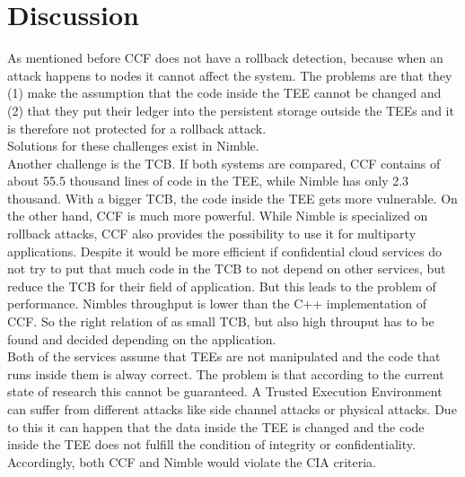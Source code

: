 \section{Discussion}
\label{challenges:ccf}
As mentioned before CCF does not have a rollback detection, because when an attack happens to nodes it cannot affect the system. The problems are that they (1) make the assumption that the code inside the TEE cannot be changed and (2) that they put their ledger into the persistent storage outside the TEEs and  it is therefore not protected for a rollback attack.\\
Solutions for these challenges exist in Nimble.\\
Another challenge is the TCB. If both systems are compared, CCF contains of about 55.5 thousand lines of code in the TEE, while Nimble has only 2.3 thousand. With a bigger TCB, the code inside the TEE gets more vulnerable. On the other hand, CCF is much more powerful. While Nimble is specialized on rollback attacks, CCF also provides the possibility to use it for multiparty applications.  Despite it would be more efficient if confidential cloud services do not try to put that much code in the TCB to not depend on other services, but reduce the TCB for their field of application. But this leads to the problem of performance. Nimbles throughput is lower than the C++ implementation of CCF. So the right relation of as small TCB, but also high throuput has to be found and decided depending on the application.\\
Both of the services assume that TEEs are not manipulated and the code that runs inside them is alway correct. The problem is that according to the current state of research this cannot be guaranteed. A Trusted Execution Environment can suffer from different attacks like side channel attacks or physical attacks. Due to this it can happen that the data inside the TEE is changed and the code inside the TEE does not fulfill the condition of integrity or confidentiality. Accordingly, both CCF and Nimble would violate the CIA criteria. 